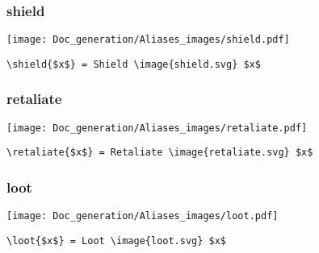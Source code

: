 \documentclass{article}
\begin{document}
\subsubsection{shield}
\begin{minipage}{0.45\linewidth}
\raggedright
\begin{spverbatim}
\end{spverbatim}
\end{minipage}
\begin{minipage}{0.45\linewidth}
\raggedleft
\texttt{[image: Doc\_generation/Aliases\_images/shield.pdf]}
\end{minipage}
\begin{center}
\begin{BVerbatim}
\shield{$x$} = Shield \image{shield.svg} $x$
\end{BVerbatim}
\end{center}

\subsubsection{retaliate}
\begin{minipage}{0.45\linewidth}
\raggedright
\begin{spverbatim}
\end{spverbatim}
\end{minipage}
\begin{minipage}{0.45\linewidth}
\raggedleft
\texttt{[image: Doc\_generation/Aliases\_images/retaliate.pdf]}
\end{minipage}
\begin{center}
\begin{BVerbatim}
\retaliate{$x$} = Retaliate \image{retaliate.svg} $x$
\end{BVerbatim}
\end{center}

\subsubsection{loot}
\begin{minipage}{0.45\linewidth}
\raggedright
\begin{spverbatim}
\end{spverbatim}
\end{minipage}
\begin{minipage}{0.45\linewidth}
\raggedleft
\texttt{[image: Doc\_generation/Aliases\_images/loot.pdf]}
\end{minipage}
\begin{center}
\begin{BVerbatim}
\loot{$x$} = Loot \image{loot.svg} $x$
\end{BVerbatim}
\end{center}
\end{document}
